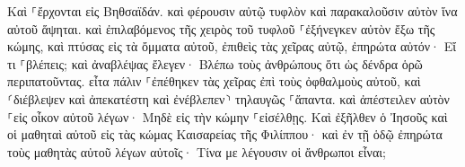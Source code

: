 \documentclass{openreader}
\begin{document}
Καὶ ⸀ἔρχονται εἰς Βηθσαϊδάν. καὶ φέρουσιν αὐτῷ τυφλὸν καὶ παρακαλοῦσιν αὐτὸν ἵνα αὐτοῦ ἅψηται. 
καὶ ἐπιλαβόμενος τῆς χειρὸς τοῦ τυφλοῦ ⸀ἐξήνεγκεν αὐτὸν ἔξω τῆς κώμης, καὶ πτύσας εἰς τὰ ὄμματα αὐτοῦ, ἐπιθεὶς τὰς χεῖρας αὐτῷ, ἐπηρώτα αὐτόν· Εἴ τι ⸀βλέπεις; 
καὶ ἀναβλέψας ἔλεγεν· Βλέπω τοὺς ἀνθρώπους ὅτι ὡς δένδρα ὁρῶ περιπατοῦντας. 
εἶτα πάλιν ⸀ἐπέθηκεν τὰς χεῖρας ἐπὶ τοὺς ὀφθαλμοὺς αὐτοῦ, καὶ ⸂διέβλεψεν καὶ ἀπεκατέστη καὶ ἐνέβλεπεν⸃ τηλαυγῶς ⸀ἅπαντα. 
καὶ ἀπέστειλεν αὐτὸν ⸀εἰς οἶκον αὐτοῦ λέγων· Μηδὲ εἰς τὴν κώμην ⸀εἰσέλθῃς. 
Καὶ ἐξῆλθεν ὁ Ἰησοῦς καὶ οἱ μαθηταὶ αὐτοῦ εἰς τὰς κώμας Καισαρείας τῆς Φιλίππου· καὶ ἐν τῇ ὁδῷ ἐπηρώτα τοὺς μαθητὰς αὐτοῦ λέγων αὐτοῖς· Τίνα με λέγουσιν οἱ ἄνθρωποι εἶναι; 
\end{document}
